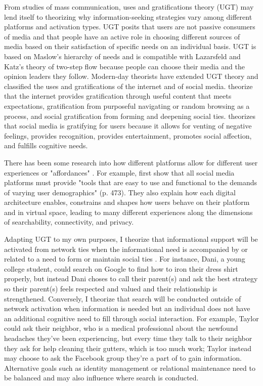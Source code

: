 From studies of mass communication, uses and gratifications theory (UGT)
\citep{blumlerUsesMassCommunications1974, tanMassCommunicationTheories1985} may
lend itself to theorizing why information-seeking strategies vary among different
platforms and activation types. UGT posits that users are not passive
consumers of media and that people have an active role in choosing different
sources of media based on their satisfaction of specific needs on an individual
basis. UGT is based on Maslow's \citeyearpar{maslowTheoryHumanMotivation1943}
hierarchy of needs and is compatible with Lazarsfeld and Katz's theory of
two-step flow because people can choose their media and the opinion leaders they
follow. Modern-day theorists have extended UGT theory and classified the uses
and gratifications of the internet and of social media.
\citet{staffordDeterminingUsesGratifications2004} theorize that the internet
provides gratification through useful content that meets expectations,
gratification from purposeful navigating or random browsing as a process, and
social gratification from forming and deepening social ties.
\citet{leungGenerationalDifferencesContent2013} theorizes that social media is
gratifying for users because it allows for venting of negative feelings,
provides recognition, provides entertainment, promotes social affection, and
fulfills cognitive needs. 

There has been some research into how different platforms allow for different user 
experiences or "affordances" \citep{boyd2010social}. For example, 
\citet{bossetta18} first show
that all social media platforms must provide "tools that are easy to use and 
functional to the demands of varying user demographics" (p. 473). They also
explain how each digital architecture enables, constrains and shapes how users
behave on their platform and in virtual space, leading to many different experiences 
along the dimensions of searchability, connectivity, and privacy. 

Adapting UGT to my own purposes, I theorize that
informational support will be activated from network ties when the informational
need is accompanied by or related to a need to form or maintain social ties
\citep{baumeister,grieve2013face}. For instance, Dani, a young college student, 
could search on Google to find how to iron their dress shirt properly, 
but instead Dani choses to call their parent(s) and ask the best strategy so their parent(s)
feels respected and valued and their relationship is strengthened. 
Conversely, I theorize that search will be conducted outside of network
activation when information is needed but an individual does not have 
an additional cognitive need to fill through social interaction. 
For example, Taylor could ask their neighbor, who is a medical professional about 
the newfound headaches they've been experiencing, but every time they talk to their
neighbor they ask for help cleaning their gutters, which is too much work; Taylor
instead may choose to ask the Facebook group they're a part of to gain information.
Alternative goals such as identity management or relational maintenance
\citep{brashersInformationSeekingAvoiding2002} need to be balanced and may also
influence where search is conducted.

